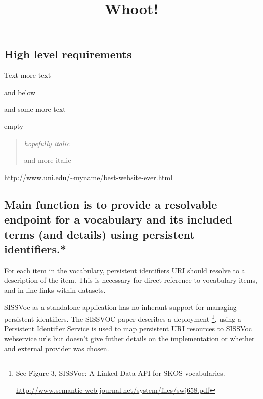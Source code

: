 \documentclass[10pt,a4paper]{article}
\title{Whoot!}
\date{}
\newenvironment{italicquotes}
{\begin{quote}\itshape}
{\end{quote}}
\let\Item\item
\newcommand\SpecialItem{\renewcommand\item[1][]{\Item[\textbullet~\bfseries##1]}}
\begin{document}
\SpecialItem

  \maketitle
    \begin{flushleft}
  \setlength{\parindent}{5ex}



\section{High level requirements}

  \item[Text] more text

    and below
  \item[and some] more text
  \item[] empty


\begin{italicquotes} hopefully italic  

  and more italic
  \end{italicquotes} 

\url{http://www.uni.edu/~myname/best-website-ever.html}



  \subsection{
   Main function is to provide a resolvable endpoint for a vocabulary and its
  included terms (and details) using persistent identifiers.* 
  }

  \item[]For each item in the vocabulary, persistent identifiers {URI} should
  resolve to a description of the item.  This is necessary for direct reference to
  vocabulary items, and in-line links within datasets.

  \item[SISSVoc] as a standalone application has no inherant support for managing persistent
  identifiers. The SISSVOC paper describes a deployment \footnote{ See Figure 3,
  SISSVoc: A Linked Data API for SKOS vocabularies.

  \url{http://www.semantic-web-journal.net/system/files/swj658.pdf} }, using a
  Persistent Identifier Service is used to map persistent URI resources to SISSVoc
  webservice urls but doesn't give futher details on the implementation or
  whether and external provider was chosen. 


\end{flushleft}
\end{document}
